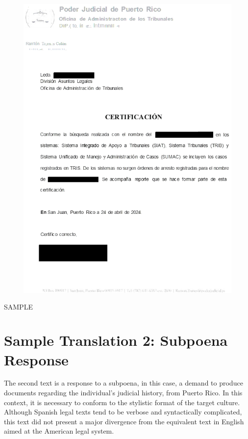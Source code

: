 \documentclass{article}
\begin{document}
\begin{figure}[H]
	\centering
	\includegraphics[width=\textwidth]{../sample_translations/target_1_4.png}
\end{figure}

SAMPLE

\section{Sample Translation 2: Subpoena Response}

The second text is a response to a subpoena, in this case, a demand to produce documents regarding the individual’s judicial history, from Puerto Rico. In this context, it is necessary to conform to the stylistic format of the target culture. Although Spanish legal texts tend to be verbose and syntactically complicated, this text did not present a major divergence from the equivalent text in English aimed at the American legal system.
\end{document}

